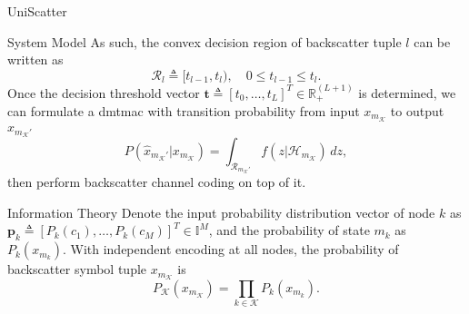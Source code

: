 \documentclass[journal]{IEEEtran}
\begin{document}
\begin{section}{UniScatter}
\begin{subsection}{System Model}
		As such, the convex decision region of backscatter tuple $l$ can be written as
		\begin{equation}
			\mathcal{R}_{l} \triangleq [t_{l-1},t_l), \quad 0 \le t_{l-1} \le t_l.
		\end{equation}
		Once the decision threshold vector $\boldsymbol{t} \triangleq [t_0,\ldots,t_L]^T \in \mathbb{R}_+^{(L+1)}$ is determined, we can formulate a \gls{dmtmac} with transition probability from input $x_{m_{\mathcal{K}}}$ to output $\hat{x}_{m_{\mathcal{K}}'}$
		\begin{equation}
			P(\hat{x}_{m_{\mathcal{K}}'}|x_{m_{\mathcal{K}}}) = \int_{\mathcal{R}_{m_{\mathcal{K}}'}} f(z|\mathcal{H}_{m_{\mathcal{K}}}) \, d z,
			\label{eq:dmtmac}
		\end{equation}
		then perform backscatter channel coding on top of it.
	\end{subsection}

	\begin{subsection}{Information Theory}
		Denote the input probability distribution vector of node $k$ as $\boldsymbol{p}_k \triangleq [P_k(c_1),\ldots,P_k(c_M)]^T \in \mathbb{I}^{M}$, and the probability of state $m_k$ as $P_k(x_{m_k})$.
		With independent encoding at all nodes, the probability of backscatter symbol tuple $x_{m_{\mathcal{K}}}$ is
		\begin{equation}
			P_{\mathcal{K}}(x_{m_{\mathcal{K}}}) = \prod_{k \in \mathcal{K}} P_k(x_{m_k}).
			\label{eq:equivalent_distribution}
		\end{equation}


\end{subsection}
\end{section}
\end{document}
